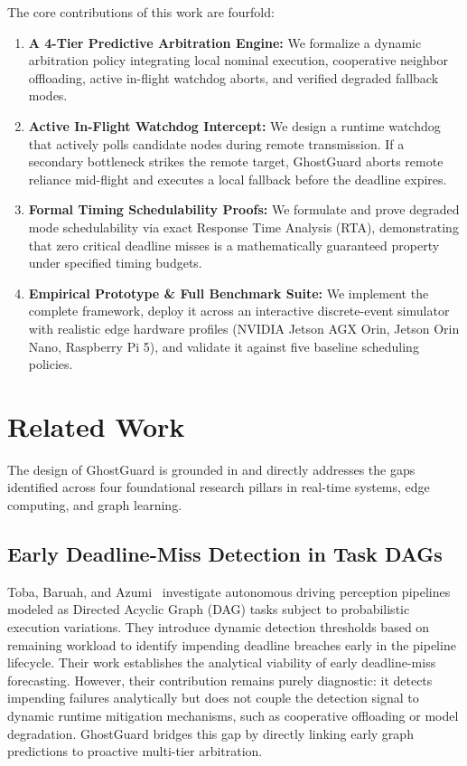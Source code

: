 \documentclass[10pt,conference]{IEEEtran}
\begin{document}
The core contributions of this work are fourfold:
\begin{enumerate}
    \item \textbf{A 4-Tier Predictive Arbitration Engine:} We formalize a dynamic arbitration policy integrating local nominal execution, cooperative neighbor offloading, active in-flight watchdog aborts, and verified degraded fallback modes.
    \item \textbf{Active In-Flight Watchdog Intercept:} We design a runtime watchdog that actively polls candidate nodes during remote transmission. If a secondary bottleneck strikes the remote target, GhostGuard aborts remote reliance mid-flight and executes a local fallback before the deadline expires.
    \item \textbf{Formal Timing Schedulability Proofs:} We formulate and prove degraded mode schedulability via exact Response Time Analysis (RTA), demonstrating that zero critical deadline misses is a mathematically guaranteed property under specified timing budgets.
    \item \textbf{Empirical Prototype \& Full Benchmark Suite:} We implement the complete framework, deploy it across an interactive discrete-event simulator with realistic edge hardware profiles (NVIDIA Jetson AGX Orin, Jetson Orin Nano, Raspberry Pi 5), and validate it against five baseline scheduling policies.
\end{enumerate}

\section{Related Work}
\label{sec:related}

The design of GhostGuard is grounded in and directly addresses the gaps identified across four foundational research pillars in real-time systems, edge computing, and graph learning.

\subsection{Early Deadline-Miss Detection in Task DAGs}
Toba, Baruah, and Azumi~\cite{paper_toba2026} investigate autonomous driving perception pipelines modeled as Directed Acyclic Graph (DAG) tasks subject to probabilistic execution variations. They introduce dynamic detection thresholds based on remaining workload to identify impending deadline breaches early in the pipeline lifecycle. Their work establishes the analytical viability of early deadline-miss forecasting. However, their contribution remains purely diagnostic: it detects impending failures analytically but does not couple the detection signal to dynamic runtime mitigation mechanisms, such as cooperative offloading or model degradation. GhostGuard bridges this gap by directly linking early graph predictions to proactive multi-tier arbitration.
\end{document}

